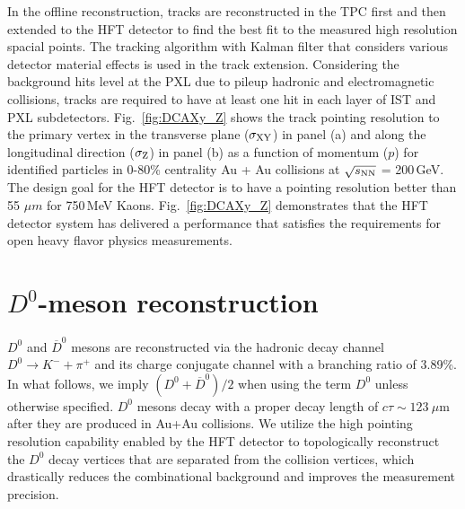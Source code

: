 \documentclass[%
 reprint,	
 amsmath,amssymb,
 aps,
 prc,
]{revtex4-1}
\begin{document}
In the offline reconstruction, tracks are reconstructed in the TPC first and then extended to the HFT detector to find the best fit to the measured high resolution spacial points. The tracking algorithm with Kalman filter that considers various detector material effects is used in the track extension. Considering the background hits level at the PXL due to pileup hadronic and electromagnetic collisions, tracks are required to have at least one hit in each layer of IST and PXL subdetectors. Fig.~\ref{fig:DCAXy_Z} shows the track pointing resolution to the primary vertex in the transverse plane ($\sigma_{\rm XY}$) in panel (a) and along the longitudinal direction ($\sigma_{\rm Z}$) in panel (b) as a function of momentum ($p$) for identified particles in 0-80\% centrality Au + Au collisions at $\sqrt{s_{\rm NN}}$ = 200\,GeV. The design goal for the HFT detector is to have a pointing resolution better than 55 $\mu m$ for 750\,MeV Kaons. Fig.~\ref{fig:DCAXy_Z} demonstrates that the HFT detector system has delivered a performance that satisfies the requirements for open heavy flavor physics measurements.


\section{\label{sec:D0recon}$D^0$-meson reconstruction}

$D^0$ and $\overline{D}^{0}$ mesons are reconstructed via the hadronic decay channel $D^0\rightarrow K^-+\pi^+$ and its charge conjugate channel with a branching ratio of 3.89\%. In what follows, we imply $(D^0 +\overline{D}^{0})/2$ when using the term $D^0$ unless otherwise specified. $D^0$ mesons decay with a proper decay length of $c\tau\sim123\ \mu$m after they are produced in Au+Au collisions. We utilize the high pointing resolution capability enabled by the HFT detector to topologically reconstruct the $D^0$ decay vertices that are separated from the collision vertices, which drastically reduces the combinational background and improves the measurement precision.
\end{document}
